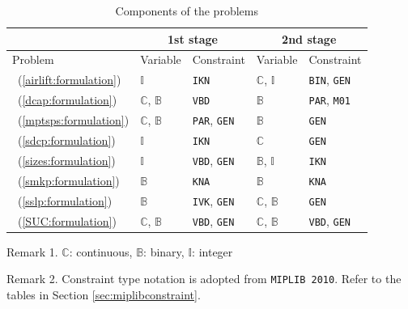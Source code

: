 \begin{table}[H]
	\centering
	\caption{Components of the problems}
	\label{table:prob_class}
	\begin{threeparttable}
		\begin{tabular}{@{}lllll@{}}
			\toprule
			& \multicolumn{2}{c}{1st stage}                              				  	& \multicolumn{2}{c}{2nd stage}                             			        \\ \midrule
			Problem 	     & Variable                    & Constraint                   	& Variable                    & Constraint                  				    \\ \midrule
			\airlift\ (\ref{airlift:formulation}) & $\mathbb{I}$ & \texttt{IKN}& $\mathbb{C}$, $\mathbb{I}$ & \texttt{BIN}, \texttt{GEN}\\
			\dcap\ (\ref{dcap:formulation})    & $\mathbb{C}$, $\mathbb{B}$  & \texttt{VBD}                	& $\mathbb{B}$                & \texttt{PAR}, \texttt{M01} 			    		\\
			\mptsps\ (\ref{mptsps:formulation})  & $\mathbb{C}$, $\mathbb{B}$  & \texttt{PAR}, \texttt{GEN}		& $\mathbb{B}$                & \texttt{GEN}               						\\
			\sdcp\ (\ref{sdcp:formulation}) & $\mathbb{I}$ & \texttt{IKN}& $\mathbb{C}$ & \texttt{GEN}\\
			\sizes\ (\ref{sizes:formulation})   & $\mathbb{I}$ 			   & \texttt{VBD}, \texttt{GEN} 	& $\mathbb{B}$, $\mathbb{I}$  & \texttt{IKN}             						\\
			\smkp\ (\ref{smkp:formulation})   & $\mathbb{B}$                & \texttt{KNA}                	& $\mathbb{B}$                & \texttt{KNA}              						\\
			\sslp\ (\ref{sslp:formulation})   & $\mathbb{B}$                & \texttt{IVK}, \texttt{GEN} 	& $\mathbb{C}$, $\mathbb{B}$  & \texttt{GEN}             						\\
			\suc\ (\ref{SUC:formulation})   & $\mathbb{C}$, $\mathbb{B}$                 & \texttt{VBD}, \texttt{GEN}                            	& $\mathbb{C}$, $\mathbb{B}$  &  \texttt{VBD}, \texttt{GEN}                                  					\\ \bottomrule
		\end{tabular}
		
		\begin{tablenotes}
			\small
			\item Remark 1. $\mathbb{C}$: continuous, $\mathbb{B}$: binary, $\mathbb{I}$: integer
			\item Remark 2. Constraint type notation is adopted from \texttt{MIPLIB 2010}. Refer to the tables in Section \ref{sec:miplibconstraint}.
		\end{tablenotes}
	\end{threeparttable}
\end{table}

